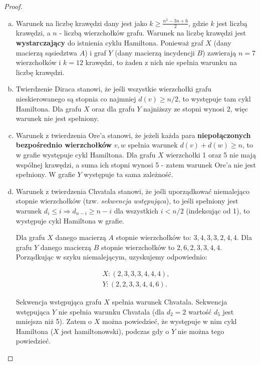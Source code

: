 \documentclass[11pt]{article}
\theoremstyle{definition}
\begin{document}
\begin{proof}
    \begin{enumerate}[a)]
        \item Warunek na liczbę krawędzi dany jest jako $k \geq \frac{n^2-3n+6}2$, gdzie $k$ jest liczbą krawędzi, a $n$ - liczbą wierzchołków grafu. Warunek na liczbę krawędzi jest \textbf{wystarczający} do istnienia cyklu Hamiltona. Ponieważ graf $X$ (dany macierzą sąsiedztwa $A$) i graf $Y$ (dany macierzą incydencji $B$) zawierają $n=7$ wierzchołków i $k=12$ krawędzi, to żaden z nich nie spełnia warunku na liczbę krawędzi.
        \item Twierdzenie Diraca stanowi, że jeśli wszystkie wierzchołki grafu nieskierowanego są stopnia co najmniej $d(v)\geq n/2$, to występuje tam cykl Hamiltona. Dla grafu $X$ oraz dla grafu $Y$ najniższy ze stopni wynosi $2$, więc warunek nie jest spełniony.
        \item Warunek z twierdzenia Ore'a stanowi, że jeżeli każda para \textbf{niepołączonych bezpośrednio wierzchołków} $v,w$ spełnia warunek $d(v)+d(w)\geq n$, to w grafie występuje cykl Hamiltona. Dla grafu $X$ wierzchołki 1 oraz 5 nie mają wspólnej krawędzi, a suma ich stopni wynosi 5 - zatem warunek Ore'a nie jest spełniony. W grafie $Y$ występuje ta sama zależność.
        \item Warunek z twierdzenia Chvatala stanowi, że jeśli uporządkować niemalejąco stopnie wierzchołków (tzw. \textit{sekwencja wstępująca}), to jeśli spełniony jest warunek $d_i\leq i \Rightarrow d_{n-i} \geq n-i$ dla wszystkich $i<n/2$ (indeksując od 1), to występuje cykl Hamiltona w grafie.

              Dla grafu $X$ danego macierzą $A$ stopnie wierzchołków to: $3,4,3,3,2,4,4$. Dla grafu $Y$ danego macierzą $B$ stopnie wierzchołków to $2,6,2,3,3,4,4$. Porządkując w szyku niemalejącym, uzyskujemy odpowiednio:

              \begin{align*}
                  X: (2,3,3,3,4,4,4), \\
                  Y: (2,2,3,3,4,4,6).
              \end{align*}

              Sekwencja wstępująca grafu $X$ spełnia warunek Chvatala. Sekwencja wstępująca $Y$ nie spełnia warunku Chvatala (dla $d_2=2$ wartość $d_5$ jest mniejsza niż 5). Zatem o $X$ można powiedzieć, że występuje w nim cykl Hamiltona ($X$ jest hamiltonowski), podczas gdy o $Y$ nie można tego powiedzieć.


\end{enumerate}
\end{proof}
\end{document}
